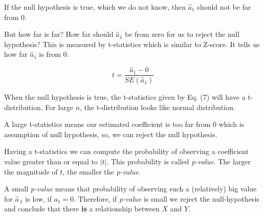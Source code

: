 \documentclass[11pt]{article}
\begin{document}
If the null hypothesis is true, which we do not know, then $\hat{a}_1$
should not be far from $0$.

But how far is far? How far should $\hat{a}_1$ be from zero for us to
reject the null hypothesis? This is measured by t-statistics which is
similar to Z-score. It tells us how far $\hat{a}_1$ is from 0.

\[ t = \frac{\hat{a}_1 - 0}{SE(\hat{a}_1)} \tag{7}\]

    When the null hypothesis is true, the t-statistics given by Eq. (7) will
have a t-distribution. For large $n$, the t-distribution looks like
normal distribution.

A large t-statistics means our estimated coefficient is too far from 0
which is assumption of null hypothesis, so, we can reject the null
hypothesis.

Having a t-statistics we can compute the probability of observing a
coefficient value greater than or equal to $\left|t\right|$. This
probability is called \emph{p-value}. The larger the magnitude of $t$,
the smaller the \emph{p-value}.

    

    A small \emph{p-value} means that probability of observing such a
(relatively) big value for $\hat{a}_{\:1}$ is low, if $a_{1}=0$.
Therefore, if \emph{p-value} is small we reject the null-hypothesis and
conclude that there \textbf{is} a relationship between $X$ and $Y$.


    
    
    
    
\end{document}
